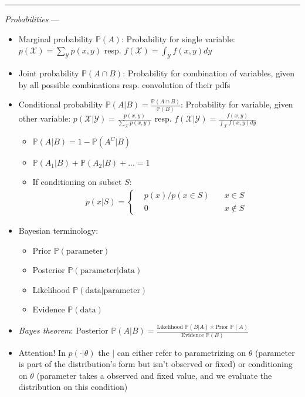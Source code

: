 {\color{lightgray}\hrule height 0.001mm}

\emph{Probabilities} --- 
\begin{itemize}
    \item Marginal probability $\mathbb{P}(A)$: Probability for single variable: $p(\mathcal{X}) = \sum_{\mathcal{Y}}p(x,y)$ resp. $f(\mathcal{X}) = \int_{\mathcal{Y}}f(x,y)dy$
    \item Joint probability $\mathbb{P}(A \cap B)$: Probability for combination of variables, given by all possible combinations resp. convolution of their pdfs 
    \item Conditional probability $\mathbb{P}(A|B) = \frac{\mathbb{P}(A \cap B)}{\mathbb{P}(B)}$: Probability for variable, given other variable: $p(\mathcal{X}|\mathcal{Y}) = \frac{p(x,y)}{\sum_{\mathcal{X}}p(x,y)}$ resp. $f(\mathcal{X}|\mathcal{Y}) = \frac{f(x,y)}{\int_{\mathcal{X}}f(x,y)dy}$
    \begin{itemize}
        \item $\mathbb{P}(A|B) = 1 - \mathbb{P}(A^C|B)$
        \item $\mathbb{P}(A_1|B) + \mathbb{P}(A_2|B) + ... = 1$
        \item If conditioning on subset $S$:
        \begin{align*}
        p(x | S) = 
        \left\{
            \begin{aligned}
                 & p(x) / p(x \in S) \quad & x \in S \\ 
                 & 0 \quad & x \notin S  
            \end{aligned}
        \right.
        \end{align*}
    \end{itemize}
    \item Bayesian terminology: 
    \begin{itemize}
        \item Prior $\mathbb{P}(\textrm{parameter})$
        \item Posterior $\mathbb{P}(\textrm{parameter} | \textrm{data})$
        \item Likelihood $\mathbb{P}(\textrm{data} | \textrm{parameter})$
        \item Evidence $\mathbb{P}(\textrm{data})$
    \end{itemize}
    \item \emph{Bayes theorem}: $\textrm{Posterior } \mathbb{P}(A|B) = \frac{\textrm{Likelihood }\mathbb{P}(B|A) \times  \textrm{Prior }\mathbb{P}(A)}{\textrm{Evidence }\mathbb{P}(B)}$
    \item Attention! In $p(\cdot | \theta)$ the $|$ can either refer to parametrizing on $\theta$ (parameter is part of the distribution's form but isn't observed or fixed) or conditioning on $\theta$ (parameter takes a observed and fixed value, and we evaluate the distribution on this condition)
\end{itemize}


